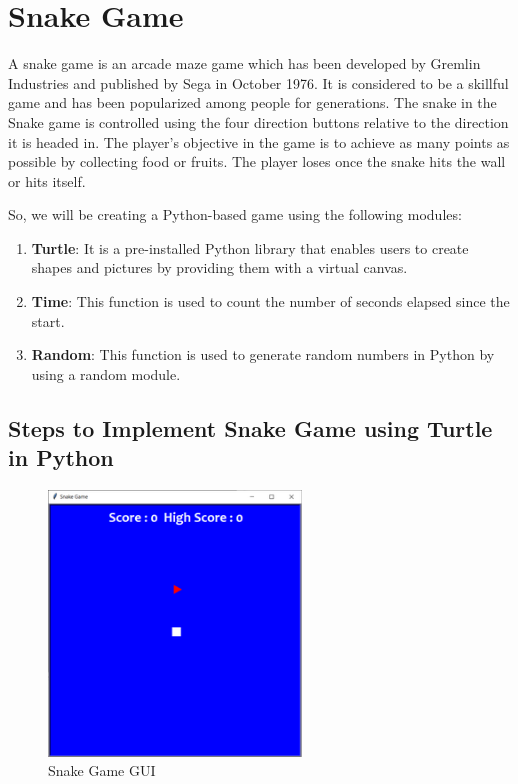 \chapter{Snake Game}

A snake game is an arcade maze game which has been developed by Gremlin Industries and published by Sega in October 1976. It is considered to be a skillful game and has been popularized among people for generations. The snake in the Snake game is controlled using the four direction buttons relative to the direction it is headed in. The player’s objective in the game is to achieve as many points as possible by collecting food or fruits. The player loses once the snake hits the wall or hits itself.

So, we will be creating a Python-based game using the following modules:

\begin{enumerate}
  \item \textbf{Turtle}: It is a pre-installed Python library that enables users to create shapes and pictures by providing them with a virtual canvas.
  \item \textbf{Time}: This function is used to count the number of seconds elapsed since the start.
  \item \textbf{Random}: This function is used to generate random numbers in Python by using a random module.
\end{enumerate}

\section{Steps to Implement Snake Game using Turtle in Python}

\begin{figure}[t]
\centering
\includegraphics[width=0.6\textwidth]{PART3/2_snake_game/image.png}
\caption{Snake Game GUI}
\end{figure}

